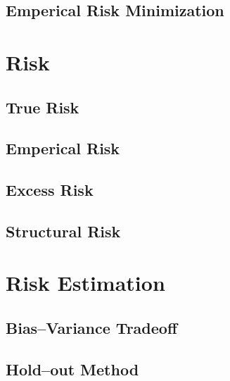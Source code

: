 \documentclass[18pt,a3paper,landscape, ncols=2]{cheatsheet}
\begin{document}
	\subsection{Emperical Risk Minimization}
		\begin{mdframed}
		\end{mdframed}

\section{Risk} \seperator
	\subsection{True Risk}
		\begin{mdframed}
		\end{mdframed}
	\subsection{Emperical Risk}
		\begin{mdframed}
		\end{mdframed}
	\subsection{Excess Risk}
		\begin{mdframed}
		\end{mdframed}
	\subsection{Structural Risk}
		\begin{mdframed}
		\end{mdframed}

	\section{Risk Estimation}
		\subsection{Bias--Variance Tradeoff}
			\begin{mdframed}
			\end{mdframed}
		\subsection{Hold--out Method}
			\begin{mdframed}
			\end{mdframed}
\end{document}
